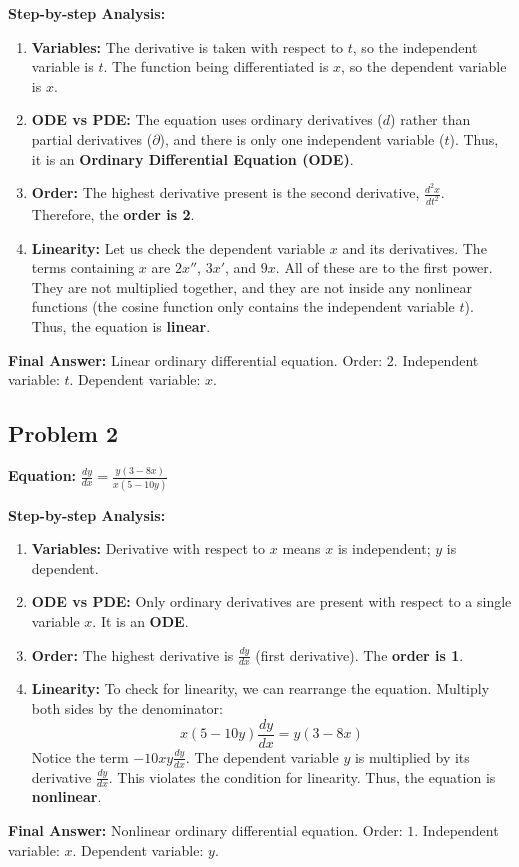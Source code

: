 \documentclass[11pt]{article}
\begin{document}
\noindent\textbf{Step-by-step Analysis:}
\begin{enumerate}
    \item \textbf{Variables:} The derivative is taken with respect to $t$, so the independent variable is $t$. The function being differentiated is $x$, so the dependent variable is $x$.
    \item \textbf{ODE vs PDE:} The equation uses ordinary derivatives ($d$) rather than partial derivatives ($\partial$), and there is only one independent variable ($t$). Thus, it is an \textbf{Ordinary Differential Equation (ODE)}.
    \item \textbf{Order:} The highest derivative present is the second derivative, $\frac{d^2x}{dt^2}$. Therefore, the \textbf{order is 2}.
    \item \textbf{Linearity:} Let us check the dependent variable $x$ and its derivatives. The terms containing $x$ are $2x''$, $3x'$, and $9x$. All of these are to the first power. They are not multiplied together, and they are not inside any nonlinear functions (the cosine function only contains the independent variable $t$). Thus, the equation is \textbf{linear}.
\end{enumerate}
\textbf{Final Answer:} Linear ordinary differential equation. Order: $2$. Independent variable: $t$. Dependent variable: $x$.

\subsection*{Problem 2}
\textbf{Equation:} $\frac{dy}{dx} = \frac{y(3-8x)}{x(5-10y)}$
\vspace{0.2cm}

\noindent\textbf{Step-by-step Analysis:}
\begin{enumerate}
    \item \textbf{Variables:} Derivative with respect to $x$ means $x$ is independent; $y$ is dependent.
    \item \textbf{ODE vs PDE:} Only ordinary derivatives are present with respect to a single variable $x$. It is an \textbf{ODE}.
    \item \textbf{Order:} The highest derivative is $\frac{dy}{dx}$ (first derivative). The \textbf{order is 1}.
    \item \textbf{Linearity:} To check for linearity, we can rearrange the equation. Multiply both sides by the denominator:
    \[ x(5 - 10y) \frac{dy}{dx} = y(3 - 8x) \]
    Notice the term $-10xy \frac{dy}{dx}$. The dependent variable $y$ is multiplied by its derivative $\frac{dy}{dx}$. This violates the condition for linearity. Thus, the equation is \textbf{nonlinear}.
\end{enumerate}
\textbf{Final Answer:} Nonlinear ordinary differential equation. Order: $1$. Independent variable: $x$. Dependent variable: $y$.
\end{document}
